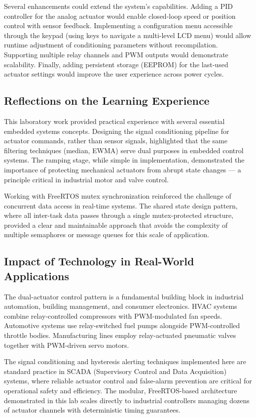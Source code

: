 Several enhancements could extend the system's capabilities. Adding a PID controller for the analog actuator would enable closed-loop speed or position control with sensor feedback. Implementing a configuration menu accessible through the keypad (using keys to navigate a multi-level LCD menu) would allow runtime adjustment of conditioning parameters without recompilation. Supporting multiple relay channels and PWM outputs would demonstrate scalability. Finally, adding persistent storage (EEPROM) for the last-used actuator settings would improve the user experience across power cycles.

\subsection{Reflections on the Learning Experience}

This laboratory work provided practical experience with several essential embedded systems concepts. Designing the signal conditioning pipeline for actuator commands, rather than sensor signals, highlighted that the same filtering techniques (median, EWMA) serve dual purposes in embedded control systems. The ramping stage, while simple in implementation, demonstrated the importance of protecting mechanical actuators from abrupt state changes --- a principle critical in industrial motor and valve control.

Working with FreeRTOS mutex synchronization reinforced the challenge of concurrent data access in real-time systems. The shared state design pattern, where all inter-task data passes through a single mutex-protected structure, provided a clear and maintainable approach that avoids the complexity of multiple semaphores or message queues for this scale of application.

\subsection{Impact of Technology in Real-World Applications}

The dual-actuator control pattern is a fundamental building block in industrial automation, building management, and consumer electronics. HVAC systems combine relay-controlled compressors with PWM-modulated fan speeds. Automotive systems use relay-switched fuel pumps alongside PWM-controlled throttle bodies. Manufacturing lines employ relay-actuated pneumatic valves together with PWM-driven servo motors.

The signal conditioning and hysteresis alerting techniques implemented here are standard practice in SCADA (Supervisory Control and Data Acquisition) systems, where reliable actuator control and false-alarm prevention are critical for operational safety and efficiency. The modular, FreeRTOS-based architecture demonstrated in this lab scales directly to industrial controllers managing dozens of actuator channels with deterministic timing guarantees.
